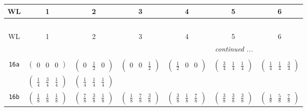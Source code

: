 \documentclass[fleqn,9pt,landscape]{jsarticle}
\begin{document}
\begin{center}
\renewcommand{\arraystretch}{1.2}
\begin{longtable}{ccccccc}
 \hline \hline
WL & 1 & 2 & 3 & 4 & 5 & 6 \\ \hline \endfirsthead

\multicolumn{6}{l}{\tablename\ \thetable{}} \\
 \hline \hline
WL & 1 & 2 & 3 & 4 & 5 & 6 \\ \hline \endhead

 \hline \hline
\multicolumn{6}{r}{\footnotesize\it continued ...} \\ \endfoot

 \hline \hline
\multicolumn{6}{r}{} \\ \endlastfoot

{\tt 16a} & $ \begin{pmatrix} 0 & 0 & 0 \end{pmatrix} $ & $ \begin{pmatrix} 0 & \frac{1}{2} & 0 \end{pmatrix} $ & $ \begin{pmatrix} 0 & 0 & \frac{1}{2} \end{pmatrix} $ & $ \begin{pmatrix} \frac{1}{2} & 0 & 0 \end{pmatrix} $ & $ \begin{pmatrix} \frac{3}{4} & \frac{1}{4} & \frac{1}{4} \end{pmatrix} $ & $ \begin{pmatrix} \frac{1}{4} & \frac{1}{4} & \frac{3}{4} \end{pmatrix} $ \\
& $ \begin{pmatrix} \frac{1}{4} & \frac{3}{4} & \frac{1}{4} \end{pmatrix} $ & $ \begin{pmatrix} \frac{1}{4} & \frac{1}{4} & \frac{1}{4} \end{pmatrix} $ & $  $ & $  $ & $  $ & $  $ \\ \hline
{\tt 16b} & $ \begin{pmatrix} \frac{1}{8} & \frac{1}{8} & \frac{1}{8} \end{pmatrix} $ & $ \begin{pmatrix} \frac{7}{8} & \frac{3}{8} & \frac{1}{8} \end{pmatrix} $ & $ \begin{pmatrix} \frac{1}{8} & \frac{7}{8} & \frac{3}{8} \end{pmatrix} $ & $ \begin{pmatrix} \frac{3}{8} & \frac{1}{8} & \frac{7}{8} \end{pmatrix} $ & $ \begin{pmatrix} \frac{3}{8} & \frac{3}{8} & \frac{3}{8} \end{pmatrix} $ & $ \begin{pmatrix} \frac{1}{8} & \frac{5}{8} & \frac{7}{8} \end{pmatrix} $ \\

\end{longtable}
\end{center}
\end{document}
